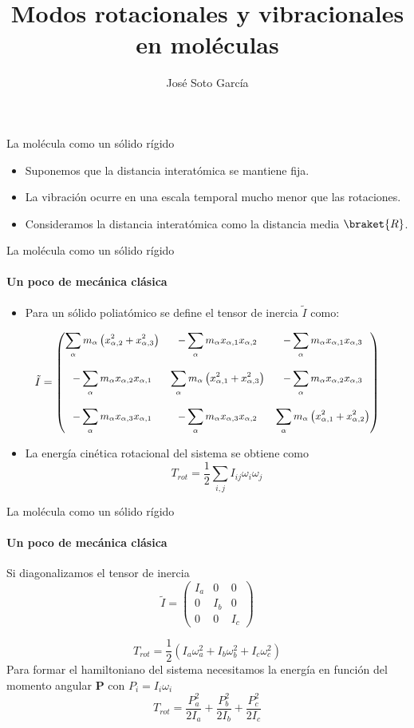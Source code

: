 \documentclass[a4paper]{beamer}
\title{Modos rotacionales y vibracionales en moléculas}
\author{José Soto García}
\begin{document}
\maketitle
\begin{frame}{La molécula como un sólido rígido}
\begin{itemize}
\item Suponemos que la distancia interatómica se mantiene fija.

\item La vibración ocurre en una escala temporal mucho menor que las rotaciones.

\item Consideramos la distancia interatómica como la distancia media $\braket{R}$.	
\end{itemize}
\end{frame}
\begin{frame}{La molécula como un sólido rígido}
\framesubtitle{Un poco de mecánica clásica}
\begin{itemize}
 \item Para un sólido poliatómico se define el tensor de inercia $\tilde I$ como:
 \end{itemize}
  \[\small{
\tilde{I}=\begin{pmatrix}
\displaystyle\sum_{\alpha}m_{\alpha}\left(x^2_{\alpha,2}+x^2_{\alpha,3}\right) & -\displaystyle\sum_{\alpha}m_{\alpha}x_{\alpha,1}x_{\alpha,2} & -\displaystyle\sum_{\alpha}m_{\alpha}x_{\alpha,1}x_{\alpha,3} \\\\
-\displaystyle\sum_{\alpha}m_{\alpha}x_{\alpha,2}x_{\alpha,1} & \displaystyle\sum_{\alpha}m_{\alpha}\left(x^2_{\alpha,1}+x^2_{\alpha,3}\right) &-\displaystyle\sum_{\alpha}m_{\alpha}x_{\alpha,2}x_{\alpha,3} \\\\
-\displaystyle\sum_{\alpha}m_{\alpha}x_{\alpha,3}x_{\alpha,1} & -\displaystyle\sum_{\alpha}m_{\alpha}x_{\alpha,3}x_{\alpha,2} & \displaystyle\sum_{\alpha}m_{\alpha}\left(x^2_{\alpha,1}+x^2_{\alpha,2}\right) \end{pmatrix}}
\]
\begin{itemize}
\item La energía cinética rotacional del sistema se obtiene como
$$T_{rot}=\frac{1}{2}\sum_{i,j}I_{ij}\omega_i\omega_j$$
\end{itemize}
\end{frame}

\begin{frame}{La molécula como un sólido rígido}
\framesubtitle{Un poco de mecánica clásica}
Si diagonalizamos el tensor de inercia
$$\tilde I = \begin{pmatrix}
I_a & 0 & 0\\
0 & I_b & 0\\
0 & 0 & I_c
\end{pmatrix}$$

$$T_{rot}=\frac{1}{2}\left(I_a\omega^2_a + I_b\omega^2_b + I_c\omega^2_c\right)$$
 Para formar el hamiltoniano del sistema necesitamos la energía en función del momento angular $\boldsymbol P$ con $P_i=I_i\omega_i$ 
 $$T_{rot}=\frac{P_a^2}{2I_a}+\frac{P_b^2}{2I_b}+\frac{P_c^2}{2I_c}$$
\end{frame}
\end{document}

